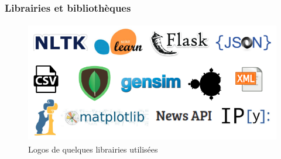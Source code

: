         \subsubsection{Librairies et bibliothèques}
            \begin{figure}[h]
                    \centering
                    \includegraphics[height=150pt,width=320pt]{img/chapter4/tools/tools.png}
                    \caption{Logos de quelques librairies utilisées}
                    \label{}
            \end{figure}
